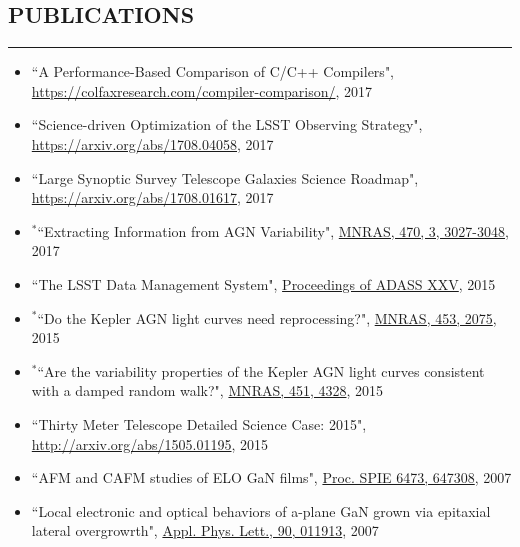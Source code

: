 \documentclass[10pt,a4]{article}
\newcounter{mySaveCounter}
\newcommand\myEnumReset{\setcounter{mySaveCounter}{0}}
\begin{document}
\subsection*{PUBLICATIONS}
\hrule  height 4pt
\vspace{0.2cm}
\begin{itemize}
  \item ``A Performance-Based Comparison of C/C++ Compilers", \href{https://colfaxresearch.com/compiler-comparison/}{https://colfaxresearch.com/compiler-comparison/}, 2017
	\item ``Science-driven Optimization of the LSST Observing Strategy", \href{https://arxiv.org/abs/1708.04058}{https://arxiv.org/abs/1708.04058}, 2017
	\item  ``Large Synoptic Survey Telescope Galaxies Science Roadmap", \href{https://arxiv.org/abs/1708.01617}{https://arxiv.org/abs/1708.01617}, 2017
	\item $\mathbf{^{*}}$``Extracting Information from AGN Variability", \href{https://doi.org/10.1093/mnras/stx1420}{MNRAS, 470, 3, 3027-3048}, 2017
	\item ``The LSST Data Management System", \href{http://adsabs.harvard.edu/cgi-bin/bib_query?arXiv:1512.07914}{Proceedings of ADASS XXV}, 2015
	\item $\mathbf{^{*}}$``Do the Kepler AGN light curves need reprocessing?", \href{http://dx.doi.org/10.1093/mnras/stv1797}{MNRAS, 453, 2075}, 2015
	\item $\mathbf{^{*}}$``Are the variability properties of the Kepler AGN light curves consistent with a damped random walk?", \href{http://dx.doi.org/ 10.1093/mnras/stv1230}{MNRAS, 451, 4328}, 2015
	\item  ``Thirty Meter Telescope Detailed Science Case: 2015", \href{http://arxiv.org/abs/1505.01195}{http://arxiv.org/abs/1505.01195}, 2015
	\item  ``AFM and CAFM studies of ELO GaN films", \href{http://dx.doi.org/10.1117/12.706773}{Proc. SPIE 6473, 647308}, 2007
	\item ``Local electronic and optical behaviors of a-plane GaN grown via epitaxial lateral overgrowrth", \href{http://dx.doi.org/10.1063/1.2429901}{Appl. Phys. Lett., 90, 011913}, 2007
\end{itemize}
\myEnumReset
\end{document}
